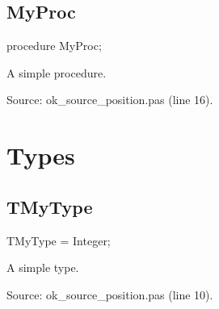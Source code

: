 \documentclass{report}
\newif\ifpdf
\begin{document}
\subsection*{MyProc}
\fi
\label{ok_source_position-MyProc}
\begin{list}{}{
\setlength{\itemindent}{0cm}
\setlength{\listparindent}{0cm}
\setlength{\leftmargin}{\evensidemargin}
\addtolength{\leftmargin}{\tmplength}
\settowidth{\labelsep}{X}
\addtolength{\leftmargin}{\labelsep}
\setlength{\labelwidth}{\tmplength}
}
\item[\textbf{Declaration}\hfill]
\ifpdf
\begin{flushleft}
\fi
\begin{ttfamily}
procedure MyProc;\end{ttfamily}

\ifpdf
\end{flushleft}
\fi

\par
\item[\textbf{Description}]
A simple procedure.\par
Source: ok{\_}source{\_}position.pas (line 16).

\end{list}
\section{Types}
\ifpdf
\subsection*{\large{\textbf{TMyType}}\normalsize\hspace{1ex}\hrulefill}
\else
\subsection*{TMyType}
\fi
\label{ok_source_position-TMyType}
\begin{list}{}{
\setlength{\itemindent}{0cm}
\setlength{\listparindent}{0cm}
\setlength{\leftmargin}{\evensidemargin}
\addtolength{\leftmargin}{\tmplength}
\settowidth{\labelsep}{X}
\addtolength{\leftmargin}{\labelsep}
\setlength{\labelwidth}{\tmplength}
}
\item[\textbf{Declaration}\hfill]
\ifpdf
\begin{flushleft}
\fi
\begin{ttfamily}
TMyType = Integer;\end{ttfamily}

\ifpdf
\end{flushleft}
\fi

\par
\item[\textbf{Description}]
A simple type.\par
Source: ok{\_}source{\_}position.pas (line 10).

\end{list}
\ifpdf
\end{document}
